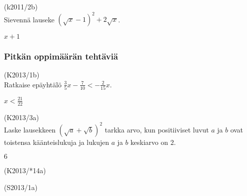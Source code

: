 \begin{tehtava}
(k2011/2b) \\ Sievennä lauseke $(\sqrt{x}-1)^2+2\sqrt{x}$.
\begin{vastaus}
$x+1$
\end{vastaus}
\end{tehtava}

\subsubsection*{Pitkän oppimäärän tehtäviä}

\begin{tehtava}
(K2013/1b) \\ Ratkaise epäyhtälö $\frac{3}{5}x-\frac{7}{10} < -\frac{2}{15}x$.
\begin{vastaus}
$x<\frac{21}{22}$
\end{vastaus}
\end{tehtava}

\begin{tehtava}
(K2013/3a) \\ Laske lausekkeen $(\sqrt{a}+\sqrt{b})^2$ tarkka arvo, kun positiiviset luvut $a$ ja $b$ ovat toistensa käänteislukuja ja lukujen $a$ ja $b$ keskiarvo on $2$.
\begin{vastaus}
$6$
\end{vastaus}
\end{tehtava}

\begin{tehtava}
(K2013/*14a) \\
\begin{vastaus}
\end{vastaus}
\end{tehtava}

\begin{tehtava}
(S2013/1a) \\
	\begin{vastaus}
	\end{vastaus}
\end{tehtava}

